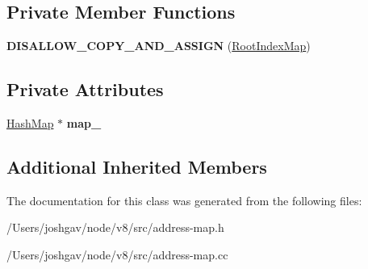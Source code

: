 \subsection*{Private Member Functions}
\begin{DoxyCompactItemize}
\item 
{\bfseries D\+I\+S\+A\+L\+L\+O\+W\+\_\+\+C\+O\+P\+Y\+\_\+\+A\+N\+D\+\_\+\+A\+S\+S\+I\+GN} (\hyperlink{classv8_1_1internal_1_1_root_index_map}{Root\+Index\+Map})\hypertarget{classv8_1_1internal_1_1_root_index_map_ac5e798dc77b929f93f0bb9eeb0ac03bb}{}\label{classv8_1_1internal_1_1_root_index_map_ac5e798dc77b929f93f0bb9eeb0ac03bb}

\end{DoxyCompactItemize}
\subsection*{Private Attributes}
\begin{DoxyCompactItemize}
\item 
\hyperlink{classv8_1_1internal_1_1_template_hash_map_impl}{Hash\+Map} $\ast$ {\bfseries map\+\_\+}\hypertarget{classv8_1_1internal_1_1_root_index_map_a5a00c36dcecdf9203532dcf626cf7fac}{}\label{classv8_1_1internal_1_1_root_index_map_a5a00c36dcecdf9203532dcf626cf7fac}

\end{DoxyCompactItemize}
\subsection*{Additional Inherited Members}


The documentation for this class was generated from the following files\+:\begin{DoxyCompactItemize}
\item 
/\+Users/joshgav/node/v8/src/address-\/map.\+h\item 
/\+Users/joshgav/node/v8/src/address-\/map.\+cc\end{DoxyCompactItemize}
